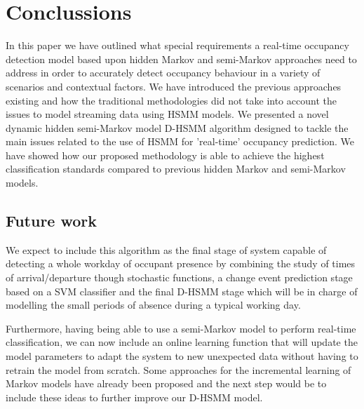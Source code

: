 \documentclass[conference]{IEEEtran}
\begin{document}
 
 \section{Conclussions}
 
 In this paper we have outlined what special requirements a real-time occupancy detection model based upon hidden Markov and semi-Markov approaches need to address in order to accurately detect occupancy behaviour in a variety of scenarios and contextual factors. We have introduced the previous approaches existing and how the traditional methodologies did not take into account the issues to model streaming data using HSMM models. We presented a novel dynamic hidden semi-Markov model D-HSMM algorithm designed to tackle the main issues related to the use of HSMM for 'real-time' occupancy prediction. We have showed how our proposed methodology is able to achieve the highest classification standards compared to previous hidden Markov and semi-Markov models.
 
 \subsection{Future work}
 
We expect to include this algorithm as the final stage of system capable of detecting a whole workday of occupant presence by combining the study of times of arrival/departure though stochastic functions, a change event prediction stage based on a SVM classifier and the final D-HSMM stage which will be in charge of modelling the small periods of absence during a typical working day.
 
 Furthermore, having being able to use a semi-Markov model to perform real-time classification, we can now include an online learning function that will update the model parameters to adapt the system to new unexpected data without having to retrain the model from scratch. Some approaches for the incremental learning of Markov models have already been proposed and the next step would be to include these ideas to further improve our D-HSMM model.
%
%
\end{document}
